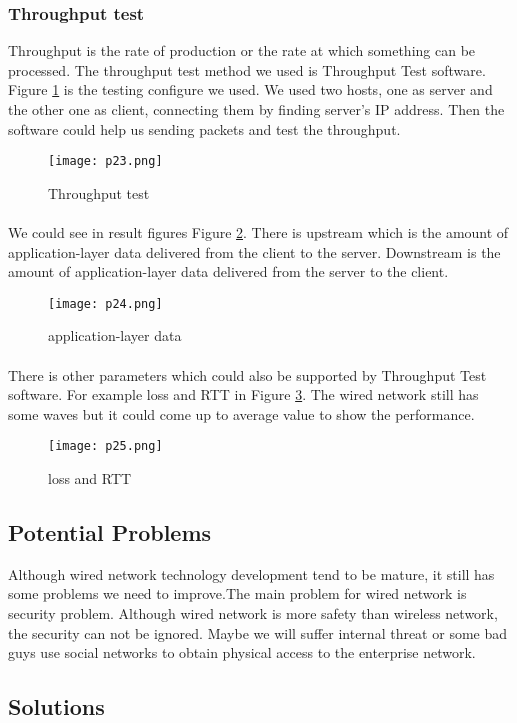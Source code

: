 \documentclass[paper=a4, fontsize=11pt]{scrartcl}
\numberwithin{equation}{section}
\numberwithin{figure}{section}
\numberwithin{table}{section}
\begin{document}
\subsubsection{Throughput test}
Throughput is the rate of production or the rate at which something can be processed. The throughput test method we used is Throughput Test software.
Figure \ref{p23} is the testing configure we used. We used two hosts, one as server and the other one as client, connecting them by finding server's IP address. Then the software could help us sending packets and test the throughput.
\begin{figure}[!htb]
\centering
\texttt{[image: p23.png]}
\caption{Throughput test}
\label{p23}
\end{figure}
\paragraph{}
We could see in result figures Figure \ref{p24}. There is upstream which is the amount of application-layer data delivered from the client to the server. Downstream is the amount of application-layer data delivered from the server to the client.
\begin{figure}[!htb]
\centering
\texttt{[image: p24.png]}
\caption{application-layer data}
\label{p24}
\end{figure}
\paragraph{}
There is other parameters which could also be supported by Throughput Test software. For example loss and RTT in Figure \ref{p25}. The wired network still has some waves but it could come up to average value to show the performance.
\begin{figure}[!htb]
\centering
\texttt{[image: p25.png]}
\caption{loss and RTT}
\label{p25}
\end{figure}
\subsection{Potential Problems}
Although wired network technology development tend to be mature, it still has some problems we need to improve.The main problem for wired network is security problem.\cite{cn5} Although wired network is more safety than wireless network, the security can not be ignored. Maybe we will suffer internal threat or some bad guys use social networks to obtain physical access to the enterprise network.
\subsection{Solutions}
\end{document}
